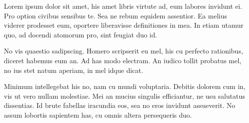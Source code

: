 Lorem ipsum dolor sit amet, his amet libris virtute ad, eum labores invidunt ei. Pro option civibus sensibus te. Sea ne rebum equidem assentior. Ea melius viderer prodesset eum, oportere liberavisse definitiones in mea. In etiam utamur quo, ad docendi atomorum pro, sint feugiat duo id.

No vis quaestio sadipscing. Homero scripserit eu mel, his cu perfecto rationibus, diceret habemus eum an. Ad has modo electram. An iudico tollit probatus mel, no ius stet natum aperiam, in mel idque dicat.

Minimum intellegebat his no, nam cu mundi voluptaria. Debitis dolorem cum in, vis ut vero nullam molestiae. Mei an mucius singulis efficiantur, ne usu salutatus dissentias. Id brute fabellas iracundia eos, sea no eros invidunt assueverit. No assum lobortis sapientem has, cu omnis altera persequeris duo.
